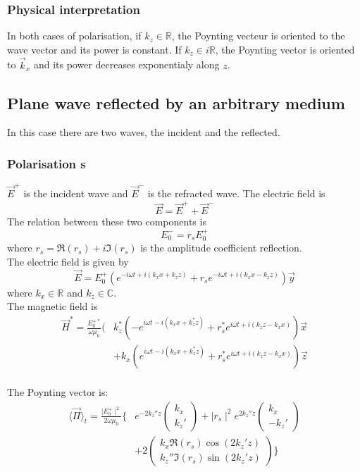 \subsubsection{Physical interpretation}
In both cases of polarisation, if $k_z\in \mathbb{R}$, the Poynting vecteur is oriented to the wave vector and its power is constant. If $k_z\in i\mathbb{R}$, the Poynting vector is oriented to $\vec{k}_x$ and its power decreases exponentialy along $z$.\\


\subsection{Plane wave reflected by an arbitrary medium}
In this case there are two waves, the incident and the reflected.
\subsubsection{Polarisation s}
$\vec{E}^+$ is the incident wave and $\vec{E}^-$ is the refracted wave. The electric field is
\begin{equation*}
\vec{E}=\vec{E}^++\vec{E}^-
\end{equation*}
The relation between these two components is
\begin{equation*}
E^-_0=r_sE^+_0
\end{equation*}
where $r_s=\Re(r_s)+i\Im(r_s)$ is the amplitude coefficient reflection.\\
The electric field is given by $$\vec{E}=E^+_0(e^{-i\omega t+i(k_xx+k_zz)}+r_se^{-i\omega t+i(k_xx-k_zz)})\vec{y}$$
where $k_x\in \mathbb{R}$ and $k_z\in \mathbb{C}$.\\
The magnetic field is\\
\begin{align*}
\vec{H}^*=\frac{E^{+*}_0}{\omega \mu _0}(&k_z^*(-e^{i\omega t-i(k_xx+k_z^*z)}+r_s^*e^{i\omega t+i(k_zz-k_xx)})\vec{x}\\
&+k_x(e^{i\omega t-i(k_xx+k_z^*z)}+r_s^*e^{i\omega t+i(k_zz-k_xx)})\vec{z}
\end{align*}\\
The Poynting vector is:\\
\begin{align*}
\langle \vec{\Pi} \rangle _t= \displaystyle\frac{\displaystyle \mid E^+_0\mid ^2}{\displaystyle 2\omega \mu _0}\Big\{&
e^{-2k_z''z}
\begin{pmatrix}
k_x\\
k_z'
\end{pmatrix}
+\mid r_s\mid ^2e^{2k_z''z}
\begin{pmatrix}
k_x\\
-k_z'
\end{pmatrix}\\
&+2
\begin{pmatrix}
k_x\Re(r_s)\cos(2k_z'z)\\
k_z''\Im(r_s)\sin(2k_z'z)
\end{pmatrix}
\Big\}
\end{align*}

